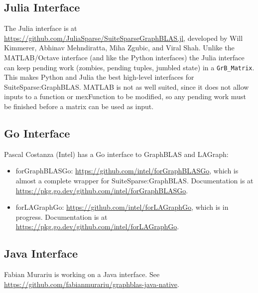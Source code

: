 \documentclass[12pt]{article}
\begin{document}
\subsection{Julia Interface}
\label{julia}

The Julia interface is at
\url{https://github.com/JuliaSparse/SuiteSparseGraphBLAS.jl}, developed by Will
Kimmerer, Abhinav Mehndiratta, Miha Zgubic, and Viral Shah.
Unlike the MATLAB/Octave interface (and like the Python interfaces) the Julia
interface can keep pending work (zombies, pending tuples, jumbled state) in
a \verb'GrB_Matrix'. This makes Python and Julia the best high-level interfaces
for SuiteSparse:GraphBLAS.  MATLAB is not as well suited, since it does not
allow inputs to a function or mexFunction to be modified, so any pending
work must be finished before a matrix can be used as input.

\subsection{Go Interface}
\label{go}

Pascal Costanza (Intel) has a Go interface to GraphBLAS and LAGraph:
\begin{itemize}
\item forGraphBLASGo: \url{https://github.com/intel/forGraphBLASGo}, which
is almost a complete wrapper for SuiteSparse:GraphBLAS.
Documentation is at \url{https://pkg.go.dev/github.com/intel/forGraphBLASGo}.
\item forLAGraphGo: \url{https://github.com/intel/forLAGraphGo}, which is in
progress.  Documentation is at
\url{https://pkg.go.dev/github.com/intel/forLAGraphGo}.
\end{itemize}

\subsection{Java Interface}
\label{java}

Fabian Murariu is working on a Java interface.
See \newline
\url{https://github.com/fabianmurariu/graphblas-java-native}.
\end{document}
